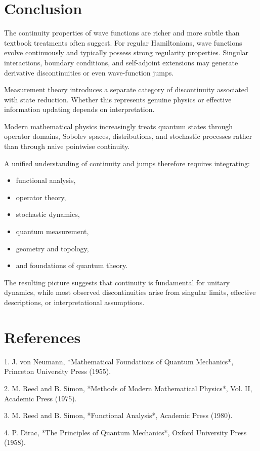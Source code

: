 \documentclass[11pt]{article}
\begin{document}
\section{ Conclusion}

The continuity properties of wave functions are richer and more subtle 
than textbook treatments often suggest.
For regular Hamiltonians, wave functions evolve continuously and typically 
possess strong regularity properties. Singular interactions, boundary 
conditions, and self-adjoint extensions may generate derivative discontinuities
or even wave-function jumps.

Measurement theory introduces a separate category of discontinuity associated 
with state reduction. Whether this represents genuine physics or effective 
information updating depends on interpretation.

Modern mathematical physics increasingly treats quantum states through operator 
domains, Sobolev spaces, distributions, and stochastic processes rather than 
through naive pointwise continuity.

A unified understanding of continuity and jumps therefore requires integrating:
\begin{itemize}
   \item functional analysis,
   \item operator theory,
   \item stochastic dynamics,
   \item quantum measurement,
   \item geometry and topology,
   \item and foundations of quantum theory.
\end{itemize}
The resulting picture suggests that continuity is fundamental for 
unitary dynamics, while most observed discontinuities arise from 
singular limits, effective descriptions, or interpretational assumptions.
\section{ References}

1. J. von Neumann, *Mathematical Foundations of Quantum Mechanics*, Princeton University Press (1955).

2. M. Reed and B. Simon, *Methods of Modern Mathematical Physics*, Vol. II, Academic Press (1975).

3. M. Reed and B. Simon, *Functional Analysis*, Academic Press (1980).

4. P. Dirac, *The Principles of Quantum Mechanics*, Oxford University Press (1958).
\end{document}
